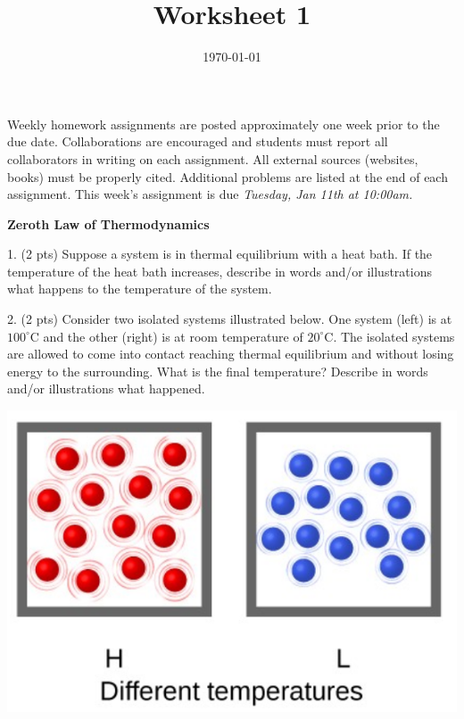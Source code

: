 \documentclass[11pt]{article}
\title{\textbf{Worksheet 1}}
\date{\vspace{-2em}\today}
\begin{document}
\maketitle

Weekly homework assignments are posted approximately one week prior to the
due date. Collaborations are encouraged and students must report all collaborators
in writing on each assignment. All external sources (websites, books) must be
properly cited. Additional problems are listed at the end of each assignment.
This week's assignment is due \textit{Tuesday, Jan 11th at 10:00am.}

\textbf{Zeroth Law of Thermodynamics}

1. (2 pts) Suppose a system is in thermal equilibrium with a heat bath. If the temperature
of the heat bath increases, describe in words and/or illustrations what happens to
the temperature of the system.

% 

\vspace{2in}

2. (2 pts) Consider two isolated systems illustrated below. One system (left) is at $100^\circ\text{C}$
and the other (right) is at room temperature of $20^\circ\text{C}$. The isolated systems are allowed
to come into contact reaching thermal equilibrium and without losing energy to the surrounding.
What is the final temperature? Describe in words and/or illustrations what happened.

\begin{center}
  \includegraphics[scale=0.25]{isolated_sys.png}
\end{center}
\end{document}
